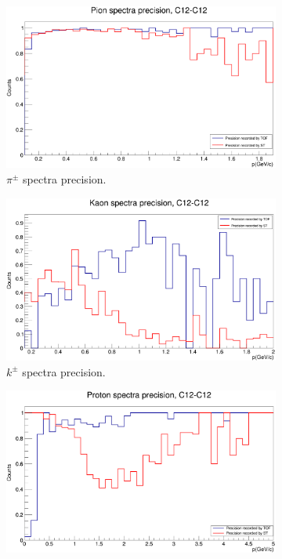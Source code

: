 \documentclass[12pt, twocolumn]{article}
\begin{document}
\begin{figure}[H]
\centering
\begin{subfigure}[h]{0.49\textwidth}
\centering
\includegraphics[scale=0.14]{PionSpectraPrecision_C12.png}
\caption{$\pi^{\pm}$ spectra precision.}
\label{Pion spectra precision, C12.}
\end{subfigure}
\par
\vspace{1.3cm}
\begin{subfigure}[h]{0.49\textwidth}
\centering
\includegraphics[scale=0.14]{KaonSpectraPrecision_C12.png}
\caption{$k^{\pm}$ spectra precision.}
\label{Kaon spectra precision, C12.}
\end{subfigure}
\par
\vspace{1.3cm}
\begin{subfigure}[h]{0.49\textwidth}
\centering
\includegraphics[scale=0.14]{ProtonSpectraPrecision_C12.png}

\end{subfigure}
\end{figure}
\end{document}
